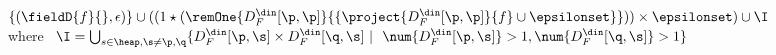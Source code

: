 \begin{itemize}
  $\{(\fieldD{f}{}, \epsilon)\}
  \cup ((1 \star (\remOne{D_F^{\din}[\p,
      \p]}{ \{\project{D_F^{\din}[\p,\p]}{f} \cup \epsilonset \} })) \times \epsilonset) \cup  \I$ \\
  \quad \quad where \ 
  $\I  =   \bigcup_{s\in\heap,\s \not= \p,\q } \{ {D_F^{\din}[\p,\s] \times D_F^{\din}[\q,\s] \ \vert \  \ \num{D_F^{\din}[\p,\s]} >1 , \num{D_F^{\din}[\q,\s]} >1} \}$  \\

%
%     
%	  
%
%

\end{itemize}
